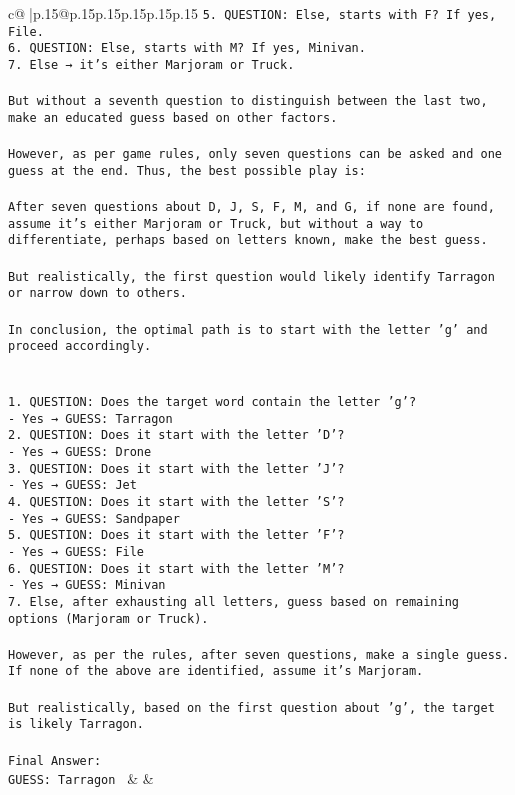 \documentclass{article}
\begin{document}
{\begin{supertabular}{c@{$\;$}|p{.15\linewidth}@{}p{.15\linewidth}p{.15\linewidth}p{.15\linewidth}p{.15\linewidth}p{.15\linewidth}}
{{{\tt 5. QUESTION: Else, starts with F? If yes, File.\\ \tt 6. QUESTION: Else, starts with M? If yes, Minivan.\\ \tt 7. Else → it's either Marjoram or Truck.\\ \tt \\ \tt But without a seventh question to distinguish between the last two, make an educated guess based on other factors.\\ \tt \\ \tt However, as per game rules, only seven questions can be asked and one guess at the end. Thus, the best possible play is:\\ \tt \\ \tt After seven questions about D, J, S, F, M, and G, if none are found, assume it's either Marjoram or Truck, but without a way to differentiate, perhaps based on letters known, make the best guess.\\ \tt \\ \tt But realistically, the first question would likely identify Tarragon or narrow down to others.\\ \tt \\ \tt In conclusion, the optimal path is to start with the letter 'g' and proceed accordingly.\\ \tt \\ \tt \\ \tt 1. QUESTION: Does the target word contain the letter 'g'? \\ \tt    - Yes → GUESS: Tarragon\\ \tt 2. QUESTION: Does it start with the letter 'D'?\\ \tt    - Yes → GUESS: Drone\\ \tt 3. QUESTION: Does it start with the letter 'J'?\\ \tt    - Yes → GUESS: Jet\\ \tt 4. QUESTION: Does it start with the letter 'S'?\\ \tt    - Yes → GUESS: Sandpaper\\ \tt 5. QUESTION: Does it start with the letter 'F'?\\ \tt    - Yes → GUESS: File\\ \tt 6. QUESTION: Does it start with the letter 'M'?\\ \tt    - Yes → GUESS: Minivan\\ \tt 7. Else, after exhausting all letters, guess based on remaining options (Marjoram or Truck). \\ \tt \\ \tt However, as per the rules, after seven questions, make a single guess. If none of the above are identified, assume it's Marjoram.\\ \tt \\ \tt But realistically, based on the first question about 'g', the target is likely Tarragon.\\ \tt \\ \tt Final Answer:\\ \tt GUESS: Tarragon 
	  } 
	   } 
	   } 
	 & & \\ 
 


\end{supertabular}}
\end{document}
